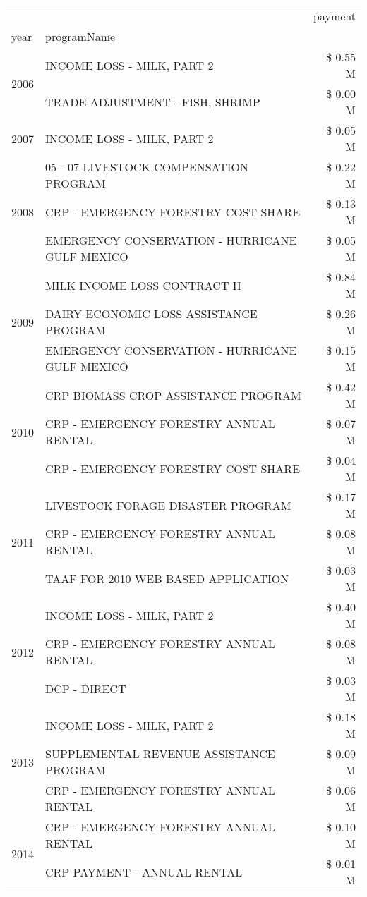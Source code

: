 \begin{tabular}{llr}
\toprule
 &  & payment \\
year & programName &  \\
\midrule
\multirow[t]{2}{*}{2006} & INCOME LOSS - MILK, PART 2 & \$ 0.55 M \\
 & TRADE ADJUSTMENT - FISH, SHRIMP & \$ 0.00 M \\
\cline{1-3}
2007 & INCOME LOSS - MILK, PART 2 & \$ 0.05 M \\
\cline{1-3}
\multirow[t]{3}{*}{2008} & 05 - 07 LIVESTOCK COMPENSATION PROGRAM & \$ 0.22 M \\
 & CRP - EMERGENCY FORESTRY COST SHARE & \$ 0.13 M \\
 & EMERGENCY CONSERVATION - HURRICANE GULF MEXICO & \$ 0.05 M \\
\cline{1-3}
\multirow[t]{3}{*}{2009} & MILK INCOME LOSS CONTRACT II & \$ 0.84 M \\
 & DAIRY ECONOMIC LOSS ASSISTANCE PROGRAM & \$ 0.26 M \\
 & EMERGENCY CONSERVATION - HURRICANE GULF MEXICO & \$ 0.15 M \\
\cline{1-3}
\multirow[t]{3}{*}{2010} & CRP BIOMASS CROP ASSISTANCE PROGRAM & \$ 0.42 M \\
 & CRP - EMERGENCY FORESTRY ANNUAL RENTAL & \$ 0.07 M \\
 & CRP - EMERGENCY FORESTRY COST SHARE & \$ 0.04 M \\
\cline{1-3}
\multirow[t]{3}{*}{2011} & LIVESTOCK FORAGE DISASTER PROGRAM & \$ 0.17 M \\
 & CRP - EMERGENCY FORESTRY ANNUAL RENTAL & \$ 0.08 M \\
 & TAAF FOR 2010 WEB BASED APPLICATION & \$ 0.03 M \\
\cline{1-3}
\multirow[t]{3}{*}{2012} & INCOME LOSS - MILK, PART 2 & \$ 0.40 M \\
 & CRP - EMERGENCY FORESTRY ANNUAL RENTAL & \$ 0.08 M \\
 & DCP - DIRECT & \$ 0.03 M \\
\cline{1-3}
\multirow[t]{3}{*}{2013} & INCOME LOSS - MILK, PART 2 & \$ 0.18 M \\
 & SUPPLEMENTAL REVENUE ASSISTANCE PROGRAM & \$ 0.09 M \\
 & CRP - EMERGENCY FORESTRY ANNUAL RENTAL & \$ 0.06 M \\
\cline{1-3}
\multirow[t]{3}{*}{2014} & CRP - EMERGENCY FORESTRY ANNUAL RENTAL & \$ 0.10 M \\
 & CRP PAYMENT - ANNUAL RENTAL & \$ 0.01 M \\

\end{tabular}

